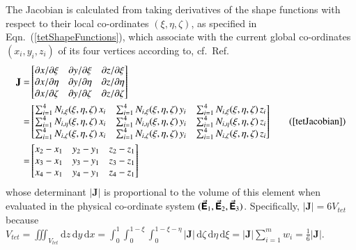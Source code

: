 The Jacobian is calculated from taking derivatives of the shape functions with respect to their local co-ordinates $(\xi, \eta, \zeta)$, as specified in Eqn.~(\ref{tetShapeFunctions}), which associate with the current global co-ordinates $(x_i, y_i, z_i)$ of its four vertices according to, cf.\ Ref.~\cite[pg.~424]{Reddy93}
\begin{equation}
\begin{aligned}
\mathbf{J}= &
\begin{bmatrix}
\partial x / \partial\xi & \partial y / \partial\xi & \partial z / \partial\xi\\
\partial x / \partial\eta & \partial y / \partial\eta & \partial z / \partial\eta \\
\partial x / \partial\zeta & \partial y / \partial\zeta & \partial z / \partial\zeta 
\end{bmatrix} \\
= & \begin{bmatrix}
\sum\nolimits_{i=1}^4 N_{i,\xi} (\xi,\eta,\zeta) \, x_i & \sum\nolimits_{i=1}^4 N_{i,\xi} (\xi,\eta,\zeta) \, y_i &
\sum\nolimits_{i=1}^4 N_{i,\xi} (\xi,\eta,\zeta) \, z_i\\
\sum\nolimits_{i=1}^4 N_{i,\eta} (\xi,\eta,\zeta) \, x_i & \sum\nolimits_{i=1}^4 N_{i,\eta} (\xi,\eta,\zeta) \, y_i &
\sum\nolimits_{i=1}^4 N_{i,\eta} (\xi,\eta,\zeta) \, z_i\\
\sum\nolimits_{i=1}^4 N_{i,\zeta} (\xi,\eta,\zeta) \, x_i & \sum\nolimits_{i=1}^4 N_{i,\zeta} (\xi,\eta,\zeta) \, y_i &
\sum\nolimits_{i=1}^4 N_{i,\zeta} (\xi,\eta,\zeta) \, z_i
\end{bmatrix} \\
= & \begin{bmatrix}
    x_2 - x_1 & y_2 - y_1 & z_2 - z_1 \\
    x_3 - x_1 & y_3 - y_1 & z_3 - z_1 \\
    x_4 - x_1 & y_4 - y_1 & z_4 - z_1
\end{bmatrix}
\end{aligned}
\tag{\ref{tetJacobian}}
\end{equation}
whose determinant $| \mathbf{J} |$ is proportional to the volume of this element when evaluated in the physical co-ordinate system $( \vec{\boldsymbol{\mathsf{E}}}_1 , \vec{\boldsymbol{\mathsf{E}}}_2 , \vec{\boldsymbol{\mathsf{E}}}_3 )$.  Specifically, $| \mathbf{J} | = 6V_{tet}$ because $V_{tet} = \iiint_{V_{tet}} \mathrm{d} z \, \mathrm{d} y \, \mathrm{d} x = \int_0^1 \int_0^{1-\xi} \int_0^{1-\xi-\eta} | \mathbf{J} | \, \mathrm{d} \zeta \, \mathrm{d} \eta \, \mathrm{d} \xi = | \mathbf{J} | \sum_{i=1}^m w_i = \tfrac{1}{6} | \mathbf{J} |$.  

